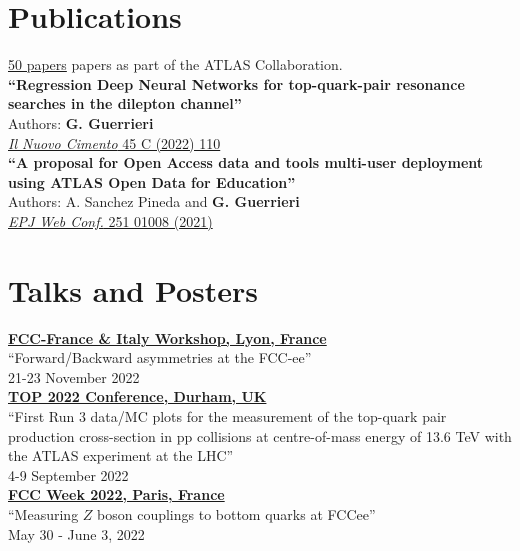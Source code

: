 \documentclass[10pt]{article} %
\begin{document}
\section{Publications}
\href{http://cdsweb.cern.ch/search?ln=en&cc=ATLAS+Papers&p=year\%3A2022&action_search=Search&op1=a&m1=a&p1=&f1=&c=ATLAS+Papers&c=&sf=&so=d&rm=&rg=100&sc=0&of=hb}{50 papers} papers as part of the ATLAS Collaboration.\\

\textbf{``Regression Deep Neural Networks for top-quark-pair resonance searches in the dilepton channel''}\\
Authors: \textbf{G. Guerrieri} \\
\href{http://dx.doi.org/10.1393/ncc/i2022-22110-0}{\emph{Il Nuovo Cimento} 45 C (2022) 110} \\

\textbf{``A proposal for Open Access data and tools multi-user deployment using ATLAS Open Data for Education''}\\
Authors: A. Sanchez Pineda and \textbf{G. Guerrieri} \\
\href{http://dx.doi.org/10.1051/epjconf/202125101008}{\emph{EPJ Web Conf.} 251 01008 (2021)} \\


\section{Talks and Posters}
\textbf{\href{https://indico.in2p3.fr/event/27968/contributions/115537}{FCC-France \& Italy Workshop, Lyon, France}} \\
``Forward/Backward asymmetries at the FCC-ee'' \\
21-23 November 2022  \\

\textbf{\href{https://conference.ippp.dur.ac.uk/event/925/contributions/5840/}{TOP 2022 Conference, Durham, UK}} \\
``First Run 3 data/MC plots for the measurement of the top-quark pair production cross-section in pp collisions at centre-of-mass energy of 13.6 TeV with the ATLAS experiment at the LHC'' \\
4-9 September 2022  \\

\textbf{\href{https://indico.cern.ch/event/1064327/contributions/4884215/}{FCC Week 2022, Paris, France}} \\
``Measuring $Z$ boson couplings to bottom quarks at FCCee'' \\
 May 30 - June 3, 2022  \\
\end{document}
